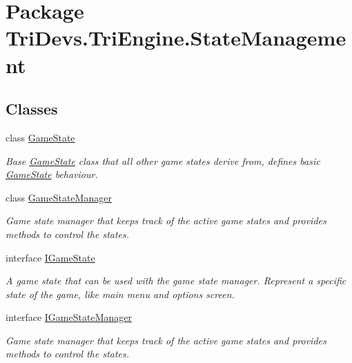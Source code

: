 \hypertarget{namespace_tri_devs_1_1_tri_engine_1_1_state_management}{\section{Package Tri\-Devs.\-Tri\-Engine.\-State\-Management}
\label{namespace_tri_devs_1_1_tri_engine_1_1_state_management}
}
\subsection*{Classes}
\begin{DoxyCompactItemize}
\item 
class \hyperlink{class_tri_devs_1_1_tri_engine_1_1_state_management_1_1_game_state}{Game\-State}
\begin{DoxyCompactList}\small\item\em Base \hyperlink{class_tri_devs_1_1_tri_engine_1_1_state_management_1_1_game_state}{Game\-State} class that all other game states derive from, defines basic \hyperlink{class_tri_devs_1_1_tri_engine_1_1_state_management_1_1_game_state}{Game\-State} behaviour. \end{DoxyCompactList}\item 
class \hyperlink{class_tri_devs_1_1_tri_engine_1_1_state_management_1_1_game_state_manager}{Game\-State\-Manager}
\begin{DoxyCompactList}\small\item\em Game state manager that keeps track of the active game states and provides methods to control the states. \end{DoxyCompactList}\item 
interface \hyperlink{interface_tri_devs_1_1_tri_engine_1_1_state_management_1_1_i_game_state}{I\-Game\-State}
\begin{DoxyCompactList}\small\item\em A game state that can be used with the game state manager. Represent a specific state of the game, like main menu and options screen. \end{DoxyCompactList}\item 
interface \hyperlink{interface_tri_devs_1_1_tri_engine_1_1_state_management_1_1_i_game_state_manager}{I\-Game\-State\-Manager}
\begin{DoxyCompactList}\small\item\em Game state manager that keeps track of the active game states and provides methods to control the states. \end{DoxyCompactList}\end{DoxyCompactItemize}
